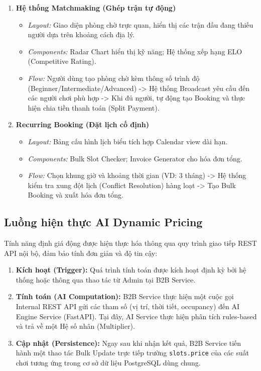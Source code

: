 \begin{enumerate}
    \item \textbf{Hệ thống Matchmaking (Ghép trận tự động)}
    \begin{itemize}
        \item \textit{Layout:} Giao diện phòng chờ trực quan, hiển thị các trận đấu đang thiếu người dựa trên khoảng cách địa lý.
        \item \textit{Components:} Radar Chart hiển thị kỹ năng; Hệ thống xếp hạng ELO (Competitive Rating).
        \item \textit{Flow:} Người dùng tạo phòng chờ kèm thông số trình độ (Beginner/Intermediate/Advanced) -> Hệ thống Broadcast yêu cầu đến các người chơi phù hợp -> Khi đủ người, tự động tạo Booking và thực hiện chia tiền thanh toán (Split Payment).
    \end{itemize}

    \item \textbf{Recurring Booking (Đặt lịch cố định)}
    \begin{itemize}
        \item \textit{Layout:} Bảng cấu hình lịch biểu tích hợp Calendar view dài hạn.
        \item \textit{Components:} Bulk Slot Checker; Invoice Generator cho hóa đơn tổng.
        \item \textit{Flow:} Chọn khung giờ và khoảng thời gian (VD: 3 tháng) -> Hệ thống kiểm tra xung đột lịch (Conflict Resolution) hàng loạt -> Tạo Bulk Booking và xuất hóa đơn tổng.
    \end{itemize}
\end{enumerate}

\subsection{Luồng hiện thực AI Dynamic Pricing}
Tính năng định giá động được hiện thực hóa thông qua quy trình giao tiếp REST API nội bộ, đảm bảo tính đơn giản và độ tin cậy:

\begin{enumerate}
    \item \textbf{Kích hoạt (Trigger):} Quá trình tính toán được kích hoạt định kỳ bởi hệ thống hoặc thông qua thao tác từ Admin tại B2B Service.
    \item \textbf{Tính toán (AI Computation):} B2B Service thực hiện một cuộc gọi Internal REST API gửi các tham số (vị trí, thời tiết, occupancy) đến AI Engine Service (FastAPI). Tại đây, AI Service thực hiện phân tích rules-based và trả về một Hệ số nhân (Multiplier).
    \item \textbf{Cập nhật (Persistence):} Ngay sau khi nhận kết quả, B2B Service tiến hành một thao tác Bulk Update trực tiếp trường \texttt{slots.price} của các suất chơi tương ứng trong cơ sở dữ liệu PostgreSQL dùng chung.
\end{enumerate}

